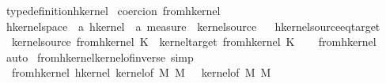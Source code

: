 \begin{isabellebody}
\endisatagproof
{\isafoldproof}%
%
\isadelimproof
\isanewline
%
\endisadelimproof
\isanewline
{}\isamarkupfalse%
\ type{\isacharunderscore}{\kern0pt}definition{\isacharunderscore}{\kern0pt}hkernel\isanewline
\isanewline
{}\isamarkupfalse%
\ {\isacharbrackleft}{\kern0pt}{\isacharbrackleft}{\kern0pt}coercion\ from{\isacharunderscore}{\kern0pt}hkernel{\isacharbrackright}{\kern0pt}{\isacharbrackright}{\kern0pt}\isanewline
\isanewline
{}\isamarkupfalse%
\ hkernel{\isacharunderscore}{\kern0pt}space\ {\isacharcolon}{\kern0pt}{\isacharcolon}{\kern0pt}\ {\isachardoublequoteopen}{\isacharprime}{\kern0pt}a\ hkernel\ {\isasymRightarrow}\ {\isacharprime}{\kern0pt}a\ measure{\isachardoublequoteclose}\ \ kernel{\isacharunderscore}{\kern0pt}source%
\isadelimproof
\ %
\endisadelimproof
%
\isatagproof
\isacommand{{\isachardot}{\kern0pt}}\isamarkupfalse%
%
\endisatagproof
{\isafoldproof}%
%
\isadelimproof
%
\endisadelimproof
\isanewline
\isanewline
{}\isamarkupfalse%
\ hkernel{\isacharunderscore}{\kern0pt}source{\isacharunderscore}{\kern0pt}eq{\isacharunderscore}{\kern0pt}target{\isacharcolon}{\kern0pt}\ \isanewline
\ \ {\isachardoublequoteopen}kernel{\isacharunderscore}{\kern0pt}source\ {\isacharparenleft}{\kern0pt}from{\isacharunderscore}{\kern0pt}hkernel\ K{\isacharparenright}{\kern0pt}\ {\isacharequal}{\kern0pt}\ kernel{\isacharunderscore}{\kern0pt}target\ {\isacharparenleft}{\kern0pt}from{\isacharunderscore}{\kern0pt}hkernel\ K{\isacharparenright}{\kern0pt}{\isachardoublequoteclose}\isanewline
%
\isadelimproof
\ \ %
\endisadelimproof
%
\isatagproof
{}\isamarkupfalse%
\ from{\isacharunderscore}{\kern0pt}hkernel\ \isamarkupfalse%
\ auto%
\endisatagproof
{\isafoldproof}%
%
\isadelimproof
\isanewline
%
\endisadelimproof
\isanewline
{}\isamarkupfalse%
\ from{\isacharunderscore}{\kern0pt}hkernel{\isacharunderscore}{\kern0pt}kernel{\isacharunderscore}{\kern0pt}of{\isacharunderscore}{\kern0pt}inverse\ {\isacharbrackleft}{\kern0pt}simp{\isacharbrackright}{\kern0pt}{\isacharcolon}{\kern0pt}\isanewline
\ \ {\isachardoublequoteopen}from{\isacharunderscore}{\kern0pt}hkernel\ {\isacharparenleft}{\kern0pt}hkernel\ {\isacharparenleft}{\kern0pt}kernel{\isacharunderscore}{\kern0pt}of\ M\ M\ {\isasymkappa}{\isacharparenright}{\kern0pt}{\isacharparenright}{\kern0pt}\ {\isacharequal}{\kern0pt}\ {\isacharparenleft}{\kern0pt}kernel{\isacharunderscore}{\kern0pt}of\ M\ M\ {\isasymkappa}{\isacharparenright}{\kern0pt}{\isachardoublequoteclose}\isanewline

\end{isabellebody}
